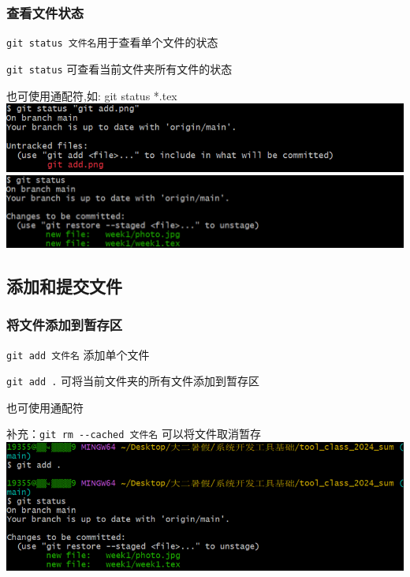 \documentclass[UTF8]{ctexart}
\begin{document}
\subsubsection{查看文件状态}
\verb|git status 文件名|\quad 用于查看单个文件的状态\par
\verb|git status| 可查看当前文件夹所有文件的状态\par
也可使用通配符,如: git status *.tex \\
\includegraphics[width=1\textwidth]{status1.png}\\
\includegraphics[width=1\textwidth]{status2.png}

\subsection{添加和提交文件}
\subsubsection{将文件添加到暂存区}

\verb|git add 文件名| \quad 添加单个文件\par 
\verb|git add .| 可将当前文件夹的所有文件添加到暂存区\par
也可使用通配符\par
补充：\verb|git rm --cached 文件名| \quad 可以将文件取消暂存\\
\includegraphics[width=1\textwidth]{git add.png}
\end{document}
